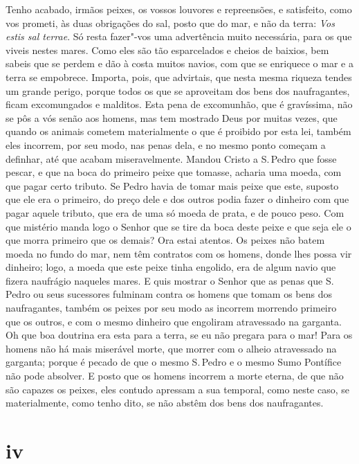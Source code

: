 Tenho acabado, irmãos peixes, os vossos louvores e repreensões, e
satisfeito, como vos prometi, às duas obrigações do sal, posto que do
mar, e não da terra: \emph{Vos estis sal terrae}. Só resta fazer"-vos uma
advertência muito necessária, para os que viveis nestes mares. Como eles
são tão esparcelados e cheios de baixios, bem sabeis que se perdem e dão
à costa muitos navios, com que se enriquece o mar e a terra se
empobrece. Importa, pois, que advirtais, que nesta mesma riqueza tendes
um grande perigo, porque todos os que se aproveitam dos bens dos
naufragantes, ficam excomungados e malditos.
Esta pena de excomunhão, que é gravíssima, não se pôs a vós senão aos
homens, mas tem mostrado Deus por muitas vezes, que quando os animais
cometem materialmente o que é proibido por esta lei, também eles
incorrem, por seu modo, nas penas dela, e no mesmo ponto começam a
definhar, até que acabam miseravelmente.
Mandou Cristo a S.\,Pedro que fosse pescar, e que na boca do primeiro
peixe que tomasse, acharia uma moeda, com que pagar certo tributo. Se
Pedro havia de tomar mais peixe que este, suposto que ele era o
primeiro, do preço dele e dos outros podia fazer o dinheiro com que
pagar aquele tributo, que era de uma só moeda de prata, e de pouco peso.
Com que mistério manda logo o Senhor que se tire da boca deste peixe e
que seja ele o que morra primeiro que os demais?
Ora estai atentos. Os peixes não batem moeda no fundo do mar, nem têm
contratos com os homens, donde lhes possa vir dinheiro; logo, a moeda
que este peixe tinha engolido, era de algum navio que fizera naufrágio
naqueles mares. E quis mostrar o Senhor que as penas que S.\,Pedro ou
seus sucessores fulminam contra os homens que tomam os bens dos
naufragantes, também os peixes por seu
modo as incorrem morrendo primeiro que os outros, e com o mesmo dinheiro
que engoliram atravessado na garganta.
Oh que boa doutrina era esta para a terra, se eu não pregara para o mar!
Para os homens não há mais miserável morte, que morrer com o alheio
atravessado na garganta; porque é pecado de que o mesmo S.\,Pedro e o
mesmo Sumo Pontífice não pode absolver. E posto que os homens incorrem a
morte eterna, de que não são capazes os peixes, eles contudo apressam a
sua temporal, como neste caso, se materialmente, como tenho dito, se não
abstêm dos bens dos naufragantes.

\section*{iv}

